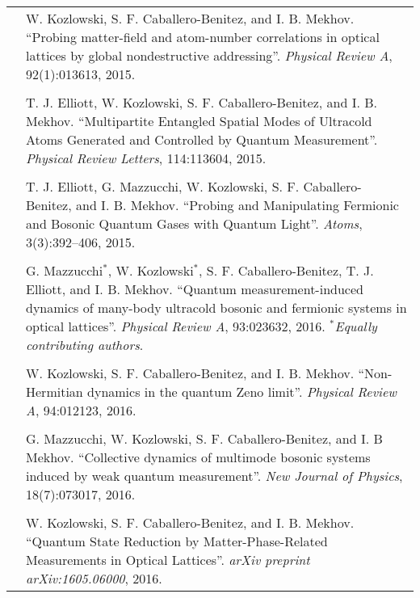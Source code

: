 \begin{table}[hbtp!]
  \centering
  \begin{tabular}{r p{13cm}}
    \toprule
    \cite{kozlowski2015} & W. Kozlowski, S. F. Caballero-Benitez, and
    I. B. Mekhov.  ``Probing matter-field and atom-number correlations
    in optical lattices by global nondestructive addressing''.
    \emph{Physical Review A}, 92(1):013613, 2015. \\ \\

    \cite{elliott2015} & T. J. Elliott, W. Kozlowski,
    S. F. Caballero-Benitez, and I. B. Mekhov. ``Multipartite
    Entangled Spatial Modes of Ultracold Atoms Generated and
    Controlled by Quantum Measurement''. \emph{Physical Review
      Letters}, 114:113604, 2015. \\ \\

    \cite{atoms2015} & T. J. Elliott, G. Mazzucchi, W. Kozlowski,
    S. F. Caballero- Benitez, and I. B. Mekhov. ``Probing and
    Manipulating Fermionic and Bosonic Quantum Gases with Quantum
    Light''. \emph{Atoms}, 3(3):392–406, 2015. \\ \\

    \cite{mazzucchi2016} & G. Mazzucchi$^*$, W. Kozlowski$^*$,
    S. F. Caballero-Benitez, T. J.  Elliott, and
    I. B. Mekhov. ``Quantum measurement-induced dynamics of many-body
    ultracold bosonic and fermionic systems in optical
    lattices''. \emph{Physical Review A}, 93:023632,
    2016. $^*$\emph{Equally contributing authors}. \\ \\

    \cite{kozlowski2016zeno} & W. Kozlowski, S. F. Caballero-Benitez,
    and I. B. Mekhov. ``Non-Hermitian dynamics in the quantum Zeno
    limit''. \emph{Physical Review A}, 94:012123, 2016. \\ \\

    \cite{mazzucchi2016njp} & G. Mazzucchi, W. Kozlowski,
    S. F. Caballero-Benitez, and I. B Mekhov. ``Collective dynamics of
    multimode bosonic systems induced by weak quantum
    measurement''. \emph{New Journal of Physics}, 18(7):073017,
    2016. \\ \\

    \cite{kozlowski2016phase} & W. Kozlowski, S. F. Caballero-Benitez,
    and I. B. Mekhov. ``Quantum State Reduction by
    Matter-Phase-Related Measurements in Optical
    Lattices''. \emph{arXiv preprint arXiv:1605.06000}, 2016. \\

    \bottomrule
  \end{tabular}
\end{table}
